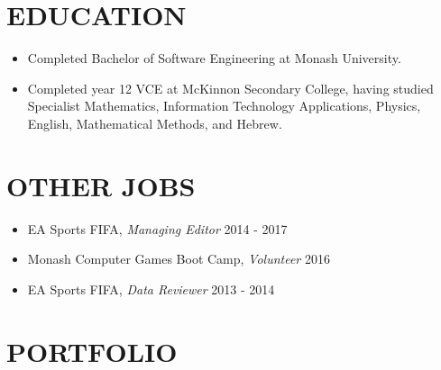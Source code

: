 \documentclass[margin, 11pt]{res} %
\begin{document}
\begin{resume}

\section{EDUCATION}

\begin{itemize}

\item Completed Bachelor of Software Engineering at Monash University. %
\item Completed year 12 VCE at McKinnon Secondary College, having studied Specialist  Mathematics, Information Technology Applications, Physics, English, Mathematical Methods, and Hebrew.

\end{itemize}


\section{OTHER JOBS} 

\begin{itemize} \itemsep -11pt

\item EA Sports FIFA, {\sl Managing Editor} \hfill 2014 - 2017\\
\item Monash Computer Games Boot Camp, {\sl Volunteer} \hfill 2016 \\
\item EA Sports FIFA, {\sl Data Reviewer} \hfill 2013 - 2014 \\
 
\end{itemize}




\section{PORTFOLIO} 


\end{resume}
\end{document}
